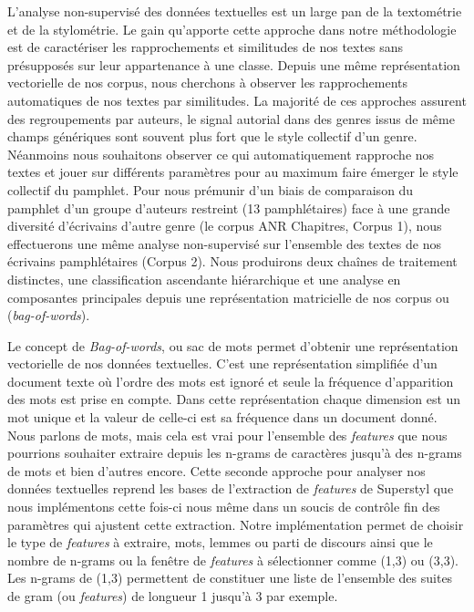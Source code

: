 L'analyse non-supervisé des données textuelles est un large pan de la textométrie et de la stylométrie. Le gain qu'apporte cette approche dans notre méthodologie est de caractériser les rapprochements et similitudes de nos textes sans présupposés sur leur appartenance à une classe. Depuis une même représentation vectorielle de nos corpus, nous cherchons à observer les rapprochements automatiques de nos textes par similitudes. La majorité de ces approches assurent des regroupements par auteurs, le signal autorial dans des genres issus de même champs génériques sont souvent plus fort que le style collectif d'un genre. Néanmoins nous souhaitons observer ce qui automatiquement rapproche nos textes et jouer sur différents paramètres pour au maximum faire émerger le style collectif du pamphlet. Pour nous prémunir d'un biais de comparaison du pamphlet d'un groupe d'auteurs restreint (13 pamphlétaires) face à une grande diversité d'écrivains d'autre genre (le corpus ANR Chapitres, Corpus 1), nous effectuerons une même analyse non-supervisé sur l'ensemble des textes de nos écrivains pamphlétaires (Corpus 2). 
Nous produirons deux chaînes de traitement distinctes, une classification ascendante hiérarchique et une analyse en composantes principales depuis une représentation matricielle de nos corpus ou (\textit{bag-of-words}). 
\par
Le concept de \textit{Bag-of-words}, ou sac de mots permet d'obtenir une représentation vectorielle de nos données textuelles. C'est une représentation simplifiée d'un document texte où l'ordre des mots est ignoré et seule la fréquence d'apparition des mots est prise en compte. Dans cette représentation chaque dimension est un mot unique et la valeur de celle-ci est sa fréquence dans un document donné. Nous parlons de mots, mais cela est vrai pour l'ensemble des \textit{features} que nous pourrions souhaiter extraire depuis les n-grams de caractères jusqu'à des n-grams de mots et bien d'autres encore. Cette seconde approche pour analyser nos données textuelles reprend les bases de l'extraction de \textit{features} de Superstyl que nous implémentons cette fois-ci nous même dans un soucis de contrôle fin des paramètres qui ajustent cette extraction. Notre implémentation permet de choisir le type de \textit{features} à extraire, mots, lemmes ou parti de discours ainsi que le nombre de n-grams ou la fenêtre de \textit{features} à sélectionner comme (1,3) ou (3,3). Les n-grams de (1,3) permettent de constituer une liste de l'ensemble des suites de gram (ou \textit{features}) de longueur 1 jusqu'à 3 par exemple.
